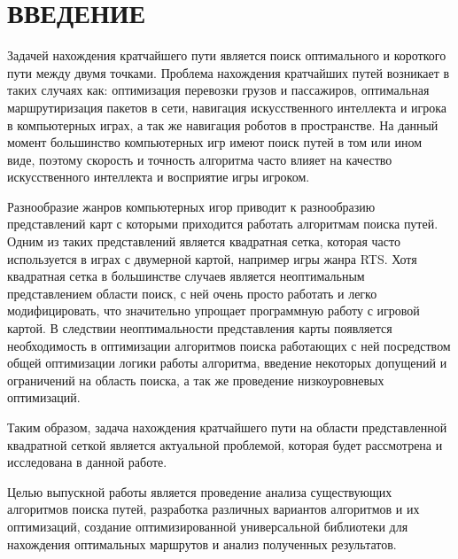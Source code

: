 \section*{ВВЕДЕНИЕ}

\vspace{1\baselineskip} 

Задачей нахождения кратчайшего пути является поиск оптимального и короткого пути между двумя точками. Проблема нахождения кратчайших путей возникает в таких случаях как: оптимизация перевозки грузов и пассажиров, оптимальная маршрутиризация пакетов в сети, навигация искусственного интеллекта и игрока в компьютерных играх, а так же навигация роботов в пространстве. На данный момент большинство компьютерных игр имеют поиск путей в том или ином виде, поэтому скорость и точность алгоритма часто влияет на качество искусственного интеллекта и восприятие игры игроком. 

Разнообразие жанров компьютерных игор приводит к разнообразию представлений карт с которыми приходится работать алгоритмам поиска путей. Одним из таких представлений является квадратная сетка, которая часто используется в играх с двумерной картой, например игры жанра RTS. Хотя квадратная сетка в большинстве случаев является неоптимальным представлением области поиск, с ней очень просто работать и легко модифицировать, что значительно упрощает программную работу с игровой картой. В следствии неоптимальности представления карты появляется необходимость в оптимизации алгоритмов поиска работающих с ней посредством общей оптимизации логики работы алгоритма, введение некоторых допущений и ограничений на область поиска, а так же проведение низкоуровневых оптимизаций.

Таким образом, задача нахождения кратчайшего пути на области представленной квадратной сеткой является актуальной проблемой, которая будет рассмотрена и исследована в данной работе.

Целью выпускной работы является проведение анализа существующих алгоритмов поиска путей, разработка различных вариантов алгоритмов и их оптимизаций, создание оптимизированной универсальной библиотеки для нахождения оптимальных маршрутов и анализ полученных результатов.

